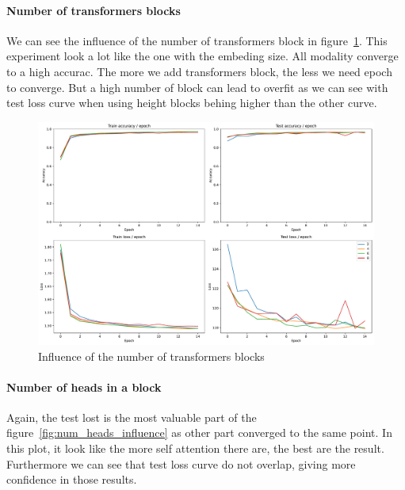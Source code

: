 \paragraph{Number of transformers blocks}
We can see the influence of the number of transformers block in figure~\ref*{fig:nb_block_influence}. This experiment look a lot like the one with the embeding size. All modality converge to a high accurac. The more we add transformers block, the less we need epoch to converge. But a high number of block can lead to overfit as we can see with test loss curve when using height blocks behing higher than the other curve.

\begin{figure}[H]
    \centering
    \includegraphics*[width=\textwidth]{figs/Transformers/nb_block_influence.pdf}
    \caption{Influence of the number of transformers blocks}
    \label{fig:nb_block_influence}
\end{figure}

\paragraph{Number of heads in a block}
Again, the test lost is the most valuable part of the figure~\ref*{fig:num_heads_influence} as other part converged to the same point. In this plot, it look like the more self attention there are, the best are the result. Furthermore we can see that test loss curve do not overlap, giving more confidence in those results.

